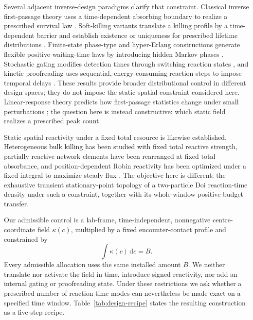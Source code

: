\documentclass[aps,physrev,reprint,amsmath,amssymb,longbibliography,floatfix]{revtex4-2}
\newcommand{\dd}{\mathrm d}
\begin{document}
Several adjacent inverse-design paradigms clarify that constraint.  Classical
inverse first-passage theory uses a time-dependent absorbing boundary to
realize a prescribed survival law \cite{zuccaSacerdote2009,ekstromJanson2016inverse}.  Soft-killing
variants translate a killing profile by a time-dependent barrier and establish
existence or uniqueness for prescribed lifetime distributions
\cite{ettingerEvansHening2014prescribed,
ettingerHeningWong2020inverse,klumpKolb2024soft}.  Finite-state phase-type and
hyper-Erlang constructions generate flexible positive waiting-time laws by
introducing hidden Markov phases
\cite{asmussenNermanOlsson1996phase,thuemmlerBuchholzTelek2006phase}.
Stochastic gating modifies detection times through switching reaction states
\cite{szaboEtAl1982gated,bressloffLawley2015gated,kumarEtAl2023gated}, and kinetic proofreading
uses sequential, energy-consuming reaction steps to impose temporal delays
\cite{hopfield1974proofreading,ninio1975amplification,
mckeithan1995proofreading}.  These results provide broader distributional
control in different design spaces; they do not impose the static spatial
constraint considered here.  Linear-response theory predicts how
first-passage statistics change under small perturbations
\cite{keidarReuveni2026linear}; the question here is instead constructive:
which static field realizes a prescribed peak count.

Static spatial reactivity under a fixed total resource is likewise
established.  Heterogeneous bulk killing has been studied with fixed total
reactive strength, partially reactive network elements have been rearranged at
fixed total absorbance, and position-dependent Robin reactivity has been
optimized under a fixed integral to maximize steady flux
\cite{nguyenGrebenkov2010porous,scottEtAl2021tubular,
nicolaouMulder2023flux}.  The objective here is different: the exhaustive
transient stationary-point topology of a two-particle Doi reaction-time
density under such a constraint, together with its whole-window
positive-budget transfer.

Our admissible control is a lab-frame, time-independent, nonnegative
centre-coordinate field \(\kappa(c)\), multiplied by a fixed encounter-contact
profile and constrained by
\begin{equation}
 \int\kappa(c)\,\dd c=B.
 \label{eq:intro-budget}
\end{equation}
Every admissible allocation uses the same installed amount \(B\).  We neither
translate nor activate the field in time, introduce signed reactivity, nor add
an internal gating or proofreading state.  Under these restrictions we ask
whether a prescribed number of reaction-time modes can nevertheless be made
exact on a specified time window.  Table~\ref{tab:design-recipe} states the
resulting construction as a five-step recipe.
\end{document}
